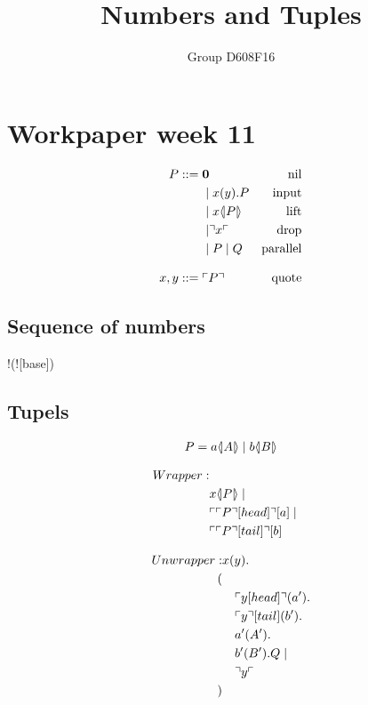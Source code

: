

\author{Group D608F16}
\title{Numbers and Tuples}



\maketitle

\section{Workpaper week 11}

\begin{align*}
P  ::= \; &  \mathbf{0} & \text{nil} \\
  & \mid x(y).P & \text{input} \\
  & \mid x \langle \! | P | \! \rangle & \text{lift} \\
  & \mid \urcorner x \ulcorner & \text{drop} \\
  & \mid P \mid Q & \text{parallel} \\[3mm]
x,y ::= \; & \ulcorner P \urcorner & \text{quote}
\end{align*}
\citep{Meredith2005}



\subsection{Sequence of numbers}
!(![base]\para {})

\subsection{Tupels}
\begin{align*}
P=a \langle \! | A | \! \rangle\mid b \langle \! | B | \! \rangle
\end{align*}



\begin{align*}
Wrapper:
\\ & x \langle \! | P | \! \rangle\mid
\\ & \ulcorner \ulcorner P \urcorner[head] \urcorner[a]\mid
\\ & \ulcorner \ulcorner P \urcorner[tail] \urcorner[b]
\end{align*}

\begin{align*}
Unwrapper: &x(y).\\
(\\
&\quad \ulcorner y[head] \urcorner(a').\\
&\quad \ulcorner y \urcorner[tail](b').\\
&\quad a'(A').\\
&\quad b'(B').Q\mid\\
&\quad \urcorner y \ulcorner\\
)
\end{align*}





\grid
\grid
